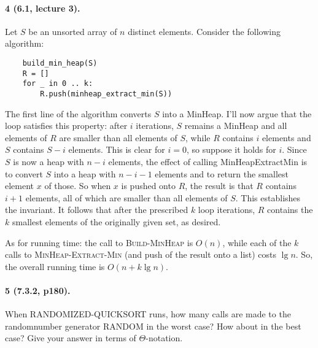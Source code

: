 \documentclass[
]{article}
\begin{document}
\paragraph{4 (6.1, lecture 3).} Let $S$ be an unsorted array of $n$ distinct elements.  Consider the following algorithm:
\begin{verbatim}
    build_min_heap(S)
    R = []
    for _ in 0 .. k:
        R.push(minheap_extract_min(S))
\end{verbatim}
The first line of the algorithm converts $S$ into a MinHeap.  I'll now argue that the loop satisfies this property: after $i$ iterations, $S$ remains a MinHeap and all elements of $R$ are smaller than all elements of $S$, while $R$ contains $i$ elements and $S$ contains $S-i$ elements.  This is clear for $i=0$, so suppose it holds for $i$.  Since $S$ is now a heap with $n-i$ elements, the effect of calling MinHeapExtractMin is to convert $S$ into a heap with $n-i-1$ elements and to return the smallest element $x$ of those.  So when $x$ is pushed onto $R$, the result is that $R$ contains $i+1$ elements, all of which are smaller than all elements of $S$.  This establishes the invariant.  It follows that after the prescribed $k$ loop iterations, $R$ contains the $k$ smallest elements of the originally given set, as desired.

As for running time: the call to \textsc{Build-MinHeap} is $O(n)$, while each of the $k$ calls to \textsc{MinHeap-Extract-Min} (and push of the result onto a list) costs $\lg n$.  So, the overall running time is $O(n + k\lg n)$.

\paragraph{5 (7.3.2, p180).} When RANDOMIZED-QUICKSORT runs, how many calls are made to the randomnumber generator RANDOM in the worst case? How about in the best case? Give
your answer in terms of $\Theta$-notation. 
\end{document}
